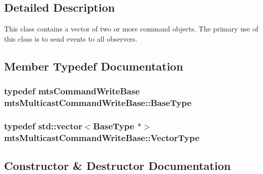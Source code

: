 \subsection{Detailed Description}
This class contains a vector of two or more command objects. The primary use of this class is to send events to all observers. 

\subsection{Member Typedef Documentation}
\hypertarget{classmts_multicast_command_write_base_a062bc9363d14a3f801a45fee24772a97}{}
\subsubsection[{Base\+Type}]{\setlength{\rightskip}{0pt plus 5cm}typedef {\bf mts\+Command\+Write\+Base} {\bf mts\+Multicast\+Command\+Write\+Base\+::\+Base\+Type}}\label{classmts_multicast_command_write_base_a062bc9363d14a3f801a45fee24772a97}
\hypertarget{classmts_multicast_command_write_base_a25953a3da11d172a87774cfebe55eaa9}{}
\subsubsection[{Vector\+Type}]{\setlength{\rightskip}{0pt plus 5cm}typedef std\+::vector$<${\bf Base\+Type} $\ast$$>$ {\bf mts\+Multicast\+Command\+Write\+Base\+::\+Vector\+Type}}\label{classmts_multicast_command_write_base_a25953a3da11d172a87774cfebe55eaa9}


\subsection{Constructor \& Destructor Documentation}
\hypertarget{classmts_multicast_command_write_base_a03fecc30b28f9ae0623eb8a8ba36c5d2}{}
